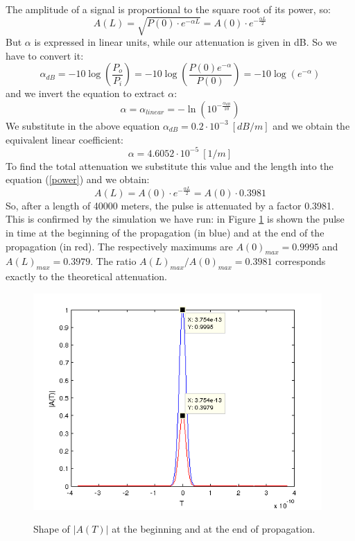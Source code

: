 \documentclass[a4paper,10pt]{report}
\begin{document}
The amplitude of a signal is proportional to the square root of its power, so:
\begin{equation}\label{power}
A(L)=\sqrt{P(0) \cdot e^{-\alpha L}}=A(0) \cdot e^{-\frac{\alpha L}{2}}
\end{equation}
But $\alpha$ is expressed in linear units, while our attenuation is given in dB.
So we have to convert it:
$$\alpha_{dB}=-10 \log \left(\frac{P_o}{P_i} \right)=-10 \log \left(\frac{P(0) e^{-\alpha}}{P(0)} \right) = -10 \log \left( e^{-\alpha} \right)$$
and we invert the equation to extract $\alpha$:
$$\alpha=\alpha_{linear}=-\ln \left( 10^{-\frac{\alpha_{dB}}{10}}\right)$$
We substitute in the above equation $\alpha_{dB}=0.2 \cdot 10^{-3}\ [dB/m]$ and we obtain the equivalent linear coefficient:
$$\alpha=4.6052\cdot10^{-5} \ [1/m]$$
To find the total attenuation we substitute this value and the length into the equation (\ref{power}) and we obtain:
$$A(L)=A(0) \cdot e^{-\frac{\alpha L}{2}}=A(0) \cdot 0.3981$$
So, after a length of 40000 meters, the pulse is attenuated by a factor 0.3981.
This is confirmed by the simulation we have run: in Figure \ref{es3} is shown the pulse in time at the beginning of the propagation (in blue)
and at the end of the propagation (in red). The respectively maximums are $A(0)_{max}=0.9995$ and $A(L)_{max}=0.3979$.
The ratio $A(L)_{max}/A(0)_{max}=0.3981$ corresponds exactly to the theoretical attenuation.

\begin{figure}[!ht]
  \centering
  \includegraphics[width=11cm]{es3.png}\\
  \caption{Shape of $|A(T)|$ at the beginning and at the end of propagation.}
  \label{es3}
\end{figure}

\newpage
\end{document}
